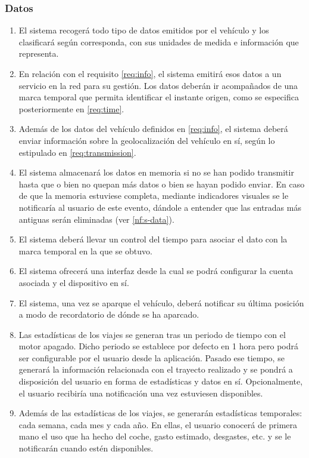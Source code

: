 \subsubsection{Datos}
\begin{enumerate}[resume, label=\textbf{\texttt{RF-\arabic*}}]
  \item\label{req:info} El sistema recogerá todo tipo de datos emitidos por el
        vehículo y los clasificará según corresponda, con sus unidades de medida
        e información que representa.
  \item\label{req:transmission} En relación con el requisito \ref{req:info},
        el sistema emitirá esos datos a un servicio en la red para su gestión. Los
        datos deberán ir acompañados de una marca temporal que permita identificar
        el instante origen, como se especifica posteriormente en \ref{req:time}.
  \item\label{req:gps-data} Además de los datos del vehículo definidos en \ref{req:info},
        el sistema deberá enviar información sobre la geolocalización del vehículo
        en sí, según lo estipulado en \ref{req:transmission}.
  \item\label{req:storage} El sistema almacenará los datos en memoria si no se han podido transmitir
        hasta que o bien no quepan más datos o bien se hayan podido enviar. En caso
        de que la memoria estuviese completa, mediante indicadores visuales se le
        notificaría al usuario de este evento, dándole a entender que las entradas
        más antiguas serán eliminadas (ver \ref{nf:s-data}).
  \item\label{req:time} El sistema deberá llevar un control del tiempo para asociar
        el dato con la marca temporal en la que se obtuvo.
  \item\label{req:conf} El sistema ofrecerá una interfaz desde la cual se podrá
        configurar la cuenta asociada y el dispositivo en sí.
  \item\label{req:parking} El sistema, una vez se aparque el vehículo, deberá
        notificar su última posición a modo de recordatorio de dónde se ha aparcado.
  \item\label{req:stats} Las estadísticas de los viajes se generan tras un periodo
        de tiempo con el motor apagado. Dicho periodo se establece por
        defecto en 1 hora pero podrá ser configurable por el usuario desde la aplicación.
        Pasado ese tiempo, se generará la información relacionada con el
        trayecto realizado y se pondrá a disposición del usuario en forma de estadísticas
        y datos en sí. Opcionalmente, el usuario recibiría una notificación una vez
        estuviesen disponibles.
  \item\label{req:periodic-stats} Además de las estadísticas de los viajes,
        se generarán estadísticas temporales: cada semana, cada mes y cada año.
        En ellas, el usuario conocerá de primera mano el uso que ha hecho del coche,
        gasto estimado, desgastes, etc. y se le notificarán cuando estén disponibles.
\end{enumerate}

